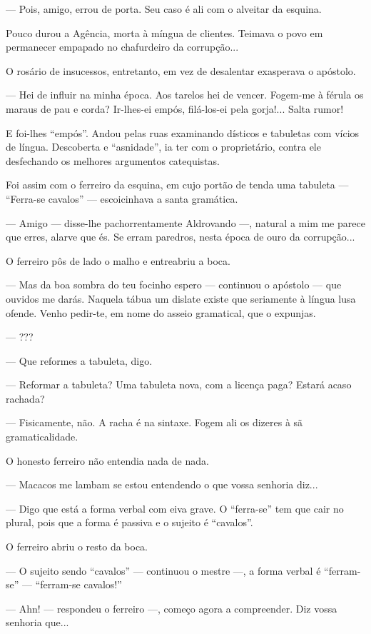 --- Pois, amigo, errou de porta. Seu caso é ali com o alveitar da
esquina.

Pouco durou a Agência, morta à míngua de clientes. Teimava o povo em
permanecer empapado no chafurdeiro da corrupção...

O rosário de insucessos, entretanto, em vez de desalentar exasperava o
apóstolo.

--- Hei de influir na minha época. Aos tarelos hei de vencer. Fogem-me à
férula os maraus de pau e corda? Ir-lhes-ei empós, filá-los-ei pela
gorja!... Salta rumor!

E foi-lhes ``empós''. Andou pelas ruas examinando dísticos e tabuletas
com vícios de língua. Descoberta e ``asnidade'', ia ter com o
proprietário, contra ele desfechando os melhores argumentos catequistas.

Foi assim com o ferreiro da esquina, em cujo portão de tenda uma
tabuleta --- ``Ferra-se cavalos'' --- escoicinhava a santa gramática.

--- Amigo --- disse-lhe pachorrentamente Aldrovando ---, natural a mim
me parece que erres, alarve que és. Se erram paredros, nesta época de
ouro da corrupção...

O ferreiro pôs de lado o malho e entreabriu a boca.

--- Mas da boa sombra do teu focinho espero --- continuou o apóstolo ---
que ouvidos me darás. Naquela tábua um dislate existe que seriamente à
língua lusa ofende. Venho pedir-te, em nome do asseio gramatical, que o
expunjas.

--- ???

--- Que reformes a tabuleta, digo.

--- Reformar a tabuleta? Uma tabuleta nova, com a licença paga? Estará
acaso rachada?

--- Fisicamente, não. A racha é na sintaxe. Fogem ali os dizeres à sã
gramaticalidade.

O honesto ferreiro não entendia nada de nada.

--- Macacos me lambam se estou entendendo o que vossa senhoria diz...

--- Digo que está a forma verbal com eiva grave. O ``ferra-se'' tem que
cair no plural, pois que a forma é passiva e o sujeito é ``cavalos''.

O ferreiro abriu o resto da boca.

--- O sujeito sendo ``cavalos'' --- continuou o mestre ---, a forma
verbal é ``ferram-se'' --- ``ferram-se cavalos!''

--- Ahn! --- respondeu o ferreiro ---, começo agora a compreender. Diz
vossa senhoria que...

